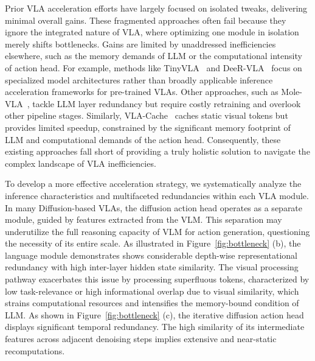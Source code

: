 Prior VLA acceleration efforts have largely focused on isolated tweaks, delivering minimal overall gains. These fragmented approaches often fail because they ignore the integrated nature of VLA, where optimizing one module in isolation merely shifts bottlenecks. Gains are limited by unaddressed inefficiencies elsewhere, such as the memory demands of LLM or the computational intensity of action head. For example, methods like TinyVLA~\citep{wen2024tinyvla} and DeeR-VLA~\citep{DeeR-VLA} focus on specialized model architectures rather than broadly applicable inference acceleration frameworks for pre-trained VLAs. Other approaches, such as Mole-VLA~\citep{zhang2025mole}, tackle LLM layer redundancy but require costly retraining and overlook other pipeline stages. Similarly, VLA-Cache~\citep{xu2025vla} caches static visual tokens but provides limited speedup, constrained by the significant memory footprint of LLM and computational demands of the action head. Consequently, these existing approaches fall short of providing a truly holistic solution to navigate the complex landscape of VLA inefficiencies.



To develop a more effective acceleration strategy, we systematically analyze the inference characteristics and multifaceted redundancies within each VLA module. In many Diffusion-based VLAs, the diffusion action head operates as a separate module, guided by features extracted from the VLM. This separation may underutilize the full reasoning capacity of VLM for action generation, questioning the necessity of its entire scale.  As illustrated in Figure~\ref{fig:bottleneck} (b), the language module demonstrates shows considerable depth-wise representational redundancy with high inter-layer hidden state similarity.  The visual processing pathway exacerbates this issue by processing superfluous tokens, characterized by low task-relevance or high informational overlap due to visual similarity, which strains computational resources and intensifies the memory-bound condition of LLM. As shown in Figure~\ref{fig:bottleneck} (c), the iterative diffusion action head  displays significant temporal redundancy. The high similarity of its intermediate features across adjacent denoising steps implies extensive and near-static recomputations. 





